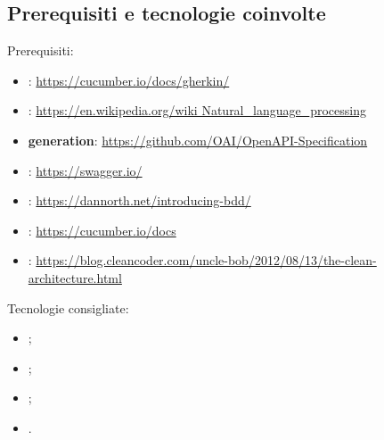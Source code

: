 \subsection{Prerequisiti e tecnologie coinvolte}
Prerequisiti:
\begin{itemize}
\item \textbf{}: \url{https://cucumber.io/docs/gherkin/}
\item \textbf{}: \url{https://en.wikipedia.org/wiki Natural_language_processing}
\item \textbf{ generation}: \url{https://github.com/OAI/OpenAPI-Specification}
\item \textbf{}: \url{https://swagger.io/}
\item \textbf{}: \url{https://dannorth.net/introducing-bdd/}
\item \textbf{}: \url{https://cucumber.io/docs}
\item \textbf{}: \url{https://blog.cleancoder.com/uncle-bob/2012/08/13/the-clean-architecture.html}
\end{itemize}
Tecnologie consigliate:
\begin{itemize}
\item {};
\item {};
\item {};
\item {}.
\end{itemize}

